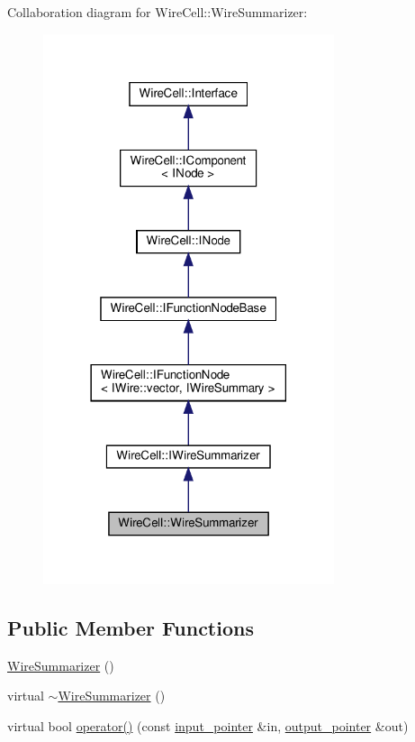 Collaboration diagram for Wire\+Cell\+:\+:Wire\+Summarizer\+:
\nopagebreak
\begin{figure}[H]
\begin{center}
\leavevmode
\includegraphics[width=242pt]{class_wire_cell_1_1_wire_summarizer__coll__graph}
\end{center}
\end{figure}
\subsection*{Public Member Functions}
\begin{DoxyCompactItemize}
\item 
\hyperlink{class_wire_cell_1_1_wire_summarizer_ac9237ca8fa5e3e391dc726a089019c78}{Wire\+Summarizer} ()
\item 
virtual \hyperlink{class_wire_cell_1_1_wire_summarizer_a67d26034d301f2d73c32dfef1b1592b8}{$\sim$\+Wire\+Summarizer} ()
\item 
virtual bool \hyperlink{class_wire_cell_1_1_wire_summarizer_ac5bec6568874039cfcc6f9b5bd8ac359}{operator()} (const \hyperlink{class_wire_cell_1_1_i_function_node_a55c0946156df9b712b8ad1a0b59b2db6}{input\+\_\+pointer} \&in, \hyperlink{class_wire_cell_1_1_i_function_node_afc02f1ec60d31aacddf64963f9ca650b}{output\+\_\+pointer} \&out)
\end{DoxyCompactItemize}
